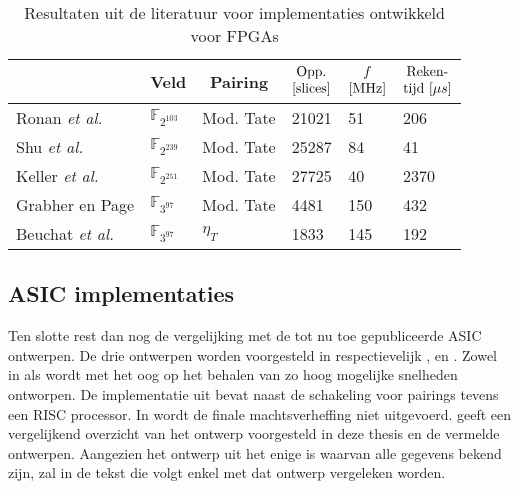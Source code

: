 \begin{table}[h]
	\caption{Resultaten uit de literatuur voor implementaties ontwikkeld voor FPGAs}
	\label{tabel-resultaten-fpga}

	\centering
	\begin{tabular}{llllll}
		\toprule
		&	\multicolumn{1}{c}{Veld}	& \multicolumn{1}{c}{Pairing}	& $\begin{array}{@{}c@{}}\text{Opp.}\\\text{[slices]}\end{array}$	& $\begin{array}{@{}c@{}}f\\\text{[MHz]}\end{array}$	& $\begin{array}{@{}c@{}}\text{Reken-}\\\text{tijd }[\mu s]\end{array}$\\
		\midrule
		Ronan \emph{et al.} \cite{ronan}				& $\mathbb{F}_{2^{103}}$	& Mod. Tate	& 21021	& 51	& 206\\
		Shu \emph{et al.} \cite{shu}					& $\mathbb{F}_{2^{239}}$	& Mod. Tate	& 25287	& 84	& 41\\
		Keller \emph{et al.} \cite{keller}			& $\mathbb{F}_{2^{251}}$	& Mod. Tate	& 27725	& 40	& 2370\\
		Grabher en Page \cite{grabher}				& $\mathbb{F}_{3^{97}}$		& Mod. Tate	& 4481	& 150	& 432\\
		Beuchat \emph{et al.} \cite{beuchat-eta}	& $\mathbb{F}_{3^{97}}$		& $\eta_T$	& 1833	& 145	& 192\\
		\bottomrule
	\end{tabular}
\end{table}

\subsection{ASIC implementaties}

Ten slotte rest dan nog de vergelijking met de tot nu toe gepubliceerde ASIC ontwerpen. De drie ontwerpen worden voorgesteld in respectievelijk \cite{beuchat-asic}, \cite{kammler} en \cite{savas}. Zowel in \cite{beuchat-asic} als \cite{savas} wordt met het oog op het behalen van zo hoog mogelijke snelheden ontworpen. De implementatie uit \cite{kammler} bevat naast de schakeling voor pairings tevens een RISC processor. In \cite{savas} wordt de finale machtsverheffing niet uitgevoerd.  geeft een vergelijkend overzicht van het ontwerp voorgesteld in deze thesis en de vermelde ontwerpen. Aangezien het ontwerp uit \cite{beuchat-asic} het enige is waarvan alle gegevens bekend zijn, zal in de tekst die volgt enkel met dat ontwerp vergeleken worden. 

